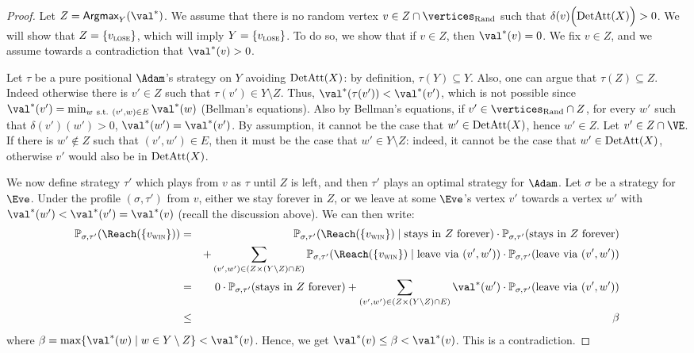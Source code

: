 \begin{proof}
Let $Z = \textsf{Argmax}_Y (\val^*)$. We assume that there is no
random vertex $v \in Z \cap \Randomvertices$ such that
$\delta(v)\Big(\textrm{DetAtt}(X)\Big)>0$. We will show that $Z =
\{v_{\textsc{lose}}\}$, which will imply $Y = \{v_{\textsc{lose}}\}$. To do so, we show
that if $v \in Z$, then $\val^*(v) = 0$.  We fix $v \in Z$, and we
assume towards a contradiction that $\val^*(v)>0$.

Let $\tau$ be a pure positional $\Adam$'s strategy on $Y$ avoiding
$\textrm{DetAtt}(X)$: by definition, $\tau(Y) \subseteq Y$. Also, one can
argue that $\tau(Z) \subseteq Z$. Indeed otherwise there is $v' \in
Z$ such that $\tau(v') \in Y \setminus Z$. Thus, $\val^*(\tau(v')) <
\val^*(v')$, which is not possible since $\val^*(v') = \min_{w\
  \text{s.t.}\ (v',w) \in E} \val^*(w)$ (Bellman's equations). Also
by Bellman's equations, if $v' \in \Randomvertices \cap Z$, for
every $w'$ such that $\delta(v')(w')>0$, $\val^*(w') =
\val^*(v')$. By assumption, it cannot be the case that $w' \in
\textrm{DetAtt}(X)$, hence $w' \in Z$.  Let $v' \in Z \cap \Evevertices$. If
there is $w' \notin Z$ such that $(v',w') \in E$, then it must be
the case that $w' \in Y \setminus Z$: indeed, it cannot be the case
that $w' \in \textrm{DetAtt}(X)$, otherwise $v'$ would also be in
$\textrm{DetAtt}(X)$.

We now define strategy $\tau'$ which plays from $v$ as $\tau$ until
$Z$ is left, and then $\tau'$ plays an optimal strategy for $\Adam$.
Let $\sigma$ be a strategy for $\Eve$. Under the profile
$(\sigma,\tau')$ from $v$, either we stay forever in $Z$, or we
leave at some $\Eve$'s vertex $v'$ towards a vertex $w'$ with
$\val^*(w') < \val^*(v') = \val^*(v)$ (recall the discussion
above). We can then write:
\begin{eqnarray*}
  \probm_{\sigma,\tau'}(\Reach(\{\vwin\})) &=&
  \probm_{\sigma,\tau'}(\Reach(\{\vwin\}) \mid \text{stays in}\  Z\
  \text{forever}) \cdot  \probm_{\sigma,\tau'}(\text{stays in}\  Z\
  \text{forever}) \\ 
  && + \sum_{(v',w') \in (Z \times (Y \setminus Z) \cap E)} 
  \probm_{\sigma,\tau'}(\Reach(\{\vwin\}) \mid
  \text{leave via}\  (v',w')) \cdot
  \probm_{\sigma,\tau'}(\text{leave via}\  (v',w')) \\
  & = & 0 \cdot \probm_{\sigma,\tau'}(\text{stays in}\  Z\
  \text{forever}) + \sum_{(v',w') \in (Z \times (Y \setminus Z) \cap
    E)}  \val^*(w') \cdot
  \probm_{\sigma,\tau'}(\text{leave via}\  (v',w')) \\
  & \le & \beta
\end{eqnarray*}
where $\beta = \max \{\val^*(w) \mid w \in Y \setminus Z\} <
\val^*(v)$.  Hence, we get $\val^*(v) \le \beta < \val^*(v)$. This
is a contradiction.
\end{proof}

